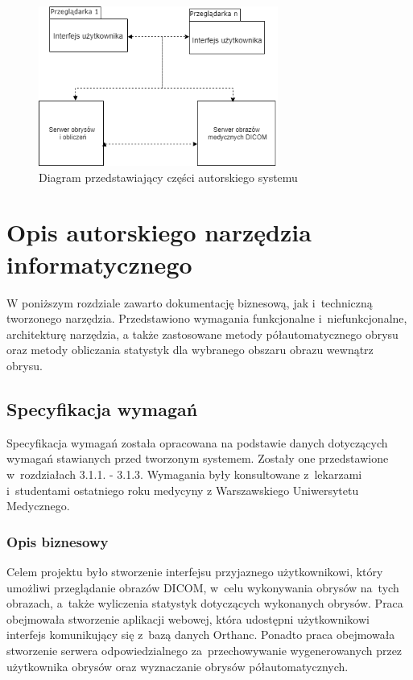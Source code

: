 \documentclass[a4paper,11pt,twoside,openright]{report}
\newcommand\blankpage{%
    \null
    \thispagestyle{empty}%
    \newpage}
\theoremstyle{definition}
\begin{document}
\begin{figure}[tb]
	\center
	\includegraphics[width=0.7\textwidth]{architektura2}
	\caption{Diagram przedstawiający części autorskiego systemu}
    	\label{fig:architektura2} %
\end{figure}

\afterpage{\blankpage}

\chapter {Opis autorskiego narzędzia informatycznego}

W poniższym rozdziale zawarto dokumentację biznesową, jak i~techniczną tworzonego narzędzia.
Przedstawiono wymagania funkcjonalne i~niefunkcjonalne,
architekturę narzędzia, a także zastosowane metody półautomatycznego obrysu oraz metody obliczania
statystyk dla wybranego obszaru obrazu wewnątrz obrysu.

\section {Specyfikacja wymagań}

Specyfikacja wymagań została opracowana na podstawie danych dotyczących wymagań stawianych
przed tworzonym systemem. Zostały one przedstawione w~rozdziałach 3.1.1. - 3.1.3. Wymagania
były konsultowane z~lekarzami i~studentami ostatniego roku medycyny z Warszawskiego Uniwersytetu Medycznego.

\subsection {Opis biznesowy}

Celem projektu było stworzenie interfejsu przyjaznego użytkownikowi, który umożliwi
przeglądanie obrazów DICOM, w~celu wykonywania obrysów na~tych obrazach, a~także wyliczenia
statystyk dotyczących wykonanych obrysów. Praca
obejmowała stworzenie aplikacji webowej, która udostępni użytkownikowi interfejs
komunikujący się z~bazą danych Orthanc. Ponadto praca obejmowała stworzenie serwera
odpowiedzialnego za~przechowywanie wygenerowanych przez użytkownika obrysów oraz
wyznaczanie obrysów półautomatycznych.
\end{document}
